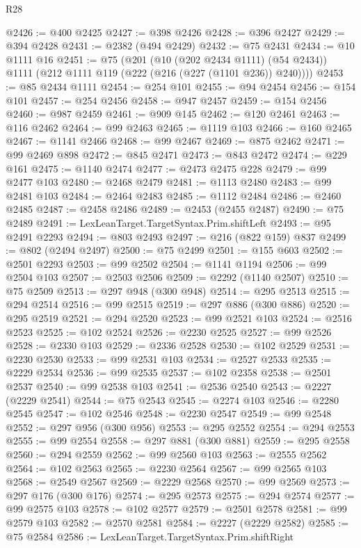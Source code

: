 \begin{lexlean}{R28}
\begin{coremodule}
@2426 := @400 @2425
@2427 := @398 @2426
@2428 := @396 @2427
@2429 := @394 @2428
@2431 := @2382 (@494 @2429)
@2432 := @75 @2431
@2434 := @10 @1111 @16
@2451 := @75
    (@201
      (@10 (@202 @2434 @1111) (@54 @2434))
      @1111
      (@212 @1111 @119 (@222 (@216 (@227 (@1101 @236)) @240))))
@2453 := @85 @2434 @1111
@2454 := @254 @101
@2455 := @94 @2454
@2456 := @154 @101
@2457 := @254 @2456
@2458 := @947 @2457
@2459 := @154 @2456
@2460 := @987 @2459
@2461 := @909 @145
@2462 := @120 @2461
@2463 := @116 @2462
@2464 := @99 @2463
@2465 := @1119 @103
@2466 := @160 @2465
@2467 := @1141 @2466
@2468 := @99 @2467
@2469 := @875 @2462
@2471 := @99 @2469 @898
@2472 := @845 @2471
@2473 := @843 @2472
@2474 := @229 @161
@2475 := @1140 @2474
@2477 := @2473 @2475 @228
@2479 := @99 @2477 @103
@2480 := @2468 @2479
@2481 := @1113 @2480
@2483 := @99 @2481 @103
@2484 := @2464 @2483
@2485 := @1112 @2484
@2486 := @2460 @2485
@2487 := @2458 @2486
@2489 := @2453 (@2455 @2487)
@2490 := @75 @2489
@2491 := LexLeanTarget.TargetSyntax.Prim.shiftLeft
@2493 := @95 @2491 @2293
@2494 := @803 @2493
@2497 := @216 (@822 @159) @837
@2499 := @802 (@2494 @2497)
@2500 := @75 @2499
@2501 := @155 @603
@2502 := @2501 @2293
@2503 := @99 @2502
@2504 := @1141 @1194
@2506 := @99 @2504 @103
@2507 := @2503 @2506
@2509 := @2292 (@1140 @2507)
@2510 := @75 @2509
@2513 := @297 @948 (@300 @948)
@2514 := @295 @2513
@2515 := @294 @2514
@2516 := @99 @2515
@2519 := @297 @886 (@300 @886)
@2520 := @295 @2519
@2521 := @294 @2520
@2523 := @99 @2521 @103
@2524 := @2516 @2523
@2525 := @102 @2524
@2526 := @2230 @2525
@2527 := @99 @2526
@2528 := @2330 @103
@2529 := @2336 @2528
@2530 := @102 @2529
@2531 := @2230 @2530
@2533 := @99 @2531 @103
@2534 := @2527 @2533
@2535 := @2229 @2534
@2536 := @99 @2535
@2537 := @102 @2358
@2538 := @2501 @2537
@2540 := @99 @2538 @103
@2541 := @2536 @2540
@2543 := @2227 (@2229 @2541)
@2544 := @75 @2543
@2545 := @2274 @103
@2546 := @2280 @2545
@2547 := @102 @2546
@2548 := @2230 @2547
@2549 := @99 @2548
@2552 := @297 @956 (@300 @956)
@2553 := @295 @2552
@2554 := @294 @2553
@2555 := @99 @2554
@2558 := @297 @881 (@300 @881)
@2559 := @295 @2558
@2560 := @294 @2559
@2562 := @99 @2560 @103
@2563 := @2555 @2562
@2564 := @102 @2563
@2565 := @2230 @2564
@2567 := @99 @2565 @103
@2568 := @2549 @2567
@2569 := @2229 @2568
@2570 := @99 @2569
@2573 := @297 @176 (@300 @176)
@2574 := @295 @2573
@2575 := @294 @2574
@2577 := @99 @2575 @103
@2578 := @102 @2577
@2579 := @2501 @2578
@2581 := @99 @2579 @103
@2582 := @2570 @2581
@2584 := @2227 (@2229 @2582)
@2585 := @75 @2584
@2586 := LexLeanTarget.TargetSyntax.Prim.shiftRight

\end{coremodule}
\end{lexlean}
